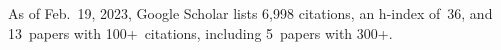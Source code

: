 %
As of Feb.~19, 2023, Google Scholar lists
6,998 citations,
an h-index of~36,
and 13~papers with 100+~citations, including 5~papers with 300+.
